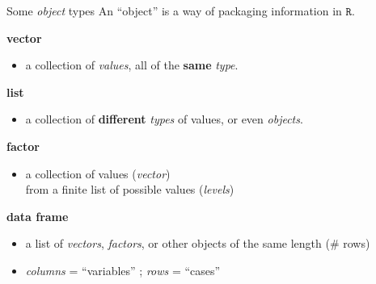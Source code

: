 \documentclass[
  11pt,
  ignorenonframetext,
]{beamer}
\providecommand{\tightlist}{%
  \setlength{\itemsep}{0pt}\setlength{\parskip}{0pt}}
\newcommand{\R}{\texttt{R}}
\begin{document}
\begin{frame}{Some \emph{object} types}
\protect\hypertarget{some-object-types}{}
An ``object'' is a way of packaging information in \(\R\).

\begin{block}{\textbf{vector}}
\protect\hypertarget{vector}{}
\begin{itemize}
\tightlist
\item
  a collection of \emph{values}, all of the \textbf{same} \emph{type}.
\end{itemize}
\end{block}

\begin{block}{\textbf{list}}
\protect\hypertarget{list}{}
\begin{itemize}
\tightlist
\item
  a collection of \textbf{different} \emph{types} of values, or even
  \emph{objects}.
\end{itemize}
\end{block}

\begin{block}{\textbf{factor}}
\protect\hypertarget{factor}{}
\begin{itemize}
\tightlist
\item
  a collection of values (\emph{vector})\\
  from a finite list of possible values (\emph{levels})
\end{itemize}
\end{block}

\begin{block}{\textbf{data frame}}
\protect\hypertarget{data-frame}{}
\begin{itemize}
\tightlist
\item
  a list of \emph{vectors}, \emph{factors}, or other objects of the same
  length (\# rows)
\item
  \emph{columns} = ``variables'' ; \emph{rows} = ``cases''
\end{itemize}
\end{block}
\end{frame}
\end{document}
